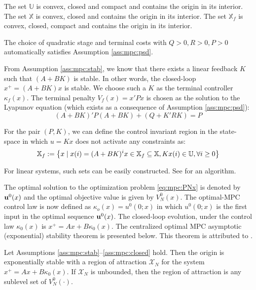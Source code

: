 \begin{assumption}
\label{ass:mpc:closed}
The set $\mathbb{U}$ is convex, closed and compact and contains the origin in
its interior. The set $\mathbb{X}$ is convex, closed and contains the origin
in its interior. The set $\mathbb{X}_f$ is  convex, closed, compact and
contains the origin in its interior.
\end{assumption}

\begin{remark}
The choice of quadratic stage and terminal costs with $Q > 0, R >0,
P>0$ automatically satisfies Assumption \ref{ass:mpc:psd}.
\end{remark} 

\begin{remark}
From Assumption \ref{ass:mpc:stab}, we know that there exists a linear
feedback $K$ such that $(A+BK)$ is stable. In other words, the
closed-loop $x^+ = (A+BK)x$ is stable. We choose such a $K$ as the
terminal controller $\kappa_f(x)$. The terminal penalty $V_f(x) =
x'Px$ is chosen as 
the solution to the Lyapunov equation (which exists as a consequence
of Assumption \ref{ass:mpc:psd}):
\[ (A+BK)'P(A+BK) + (Q+K'RK) = P \]

For the pair $(P,K)$, we can define the control invariant region in
the state-space in which $u=Kx$ does not activate any constraints as:
\[ \mathbb{X}_f := \left\lbrace x \mid x(i) = (A+BK)^ix \in \mathbb{X}_f \subseteq
  \mathbb{X}, Kx(i) \in \mathbb{U}, \forall i \geq 0 \right\rbrace
\]

For linear systems, such sets can be easily constructed. See
\citet{gilbert:tan:1991} for an algorithm. 
\end{remark}

The optimal solution to the optimization problem  \eqref{eq:mpc:PNx}
is denoted by 
$\mathbf{u}^0(x)$ and the optimal objective value is given by $V_N^0(x)$. The
optimal-MPC control law is now defined as $\kappa_o(x) = u^0(0;x)$ in
which $u^0(0;x)$ is the first input in the optimal sequence
$\mathbf{u}^0(x)$. The closed-loop evolution, under the control law
$\kappa_0(x)$ is $x^+ = Ax + B\kappa_0(x)$. The centralized optimal
MPC asymptotic (exponential) stability theorem is presented below. This theorem is
attributed to \citet[Thm 2.24(b), Chap. 2]{rawlings:mayne:2009}.

\begin{theorem}
\label{thm:mpc:optimal}
Let Assumptions \ref{ass:mpc:stab}--\ref{ass:mpc:closed} hold. Then
the origin is exponentially stable with a region of attraction
$\mathcal{X}_N$ for the system $x^+ = Ax + B\kappa_0(x)$. If
$\mathcal{X}_N$ is unbounded, then the region of attraction is any
sublevel set of $V_N^0(\cdot)$.
\end{theorem}

